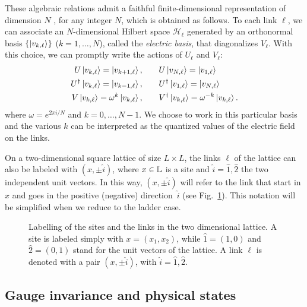 These algebraic relations admit a faithful finite-dimensional representation of dimension $N$ \cite{weyl1950theory}, for any integer $N$, which is obtained as follows.
To each link $\ell$, we can associate an $N$-dimensional Hilbert space $\mathcal{H}_\ell$ generated by an orthonormal basis $\{\ket{v_{k,\ell}}\}$ ($k=1, \dots,N$), called the \emph{electric basis},
that diagonalizes $V_\ell$.
With this choice, we can promptly write the actions of $U_\ell$ and $V_\ell$:
\begin{equation}
    \begin{split}
        U\ket{v_{k,\ell}}           = \ket{v_{k+1,\ell}}, & \qquad
        U\ket{v_{N,\ell}}           = \ket{v_{1,\ell}}\\
        U^{\dagger}\ket{v_{k,\ell}} = \ket{v_{k-1,\ell}}, & \qquad
        U^\dagger\ket{v_{1,\ell}}   = \ket{v_{N,\ell}}\\
        V\ket{v_{k,\ell}}           = \omega^k \ket{v_{k,\ell}}, & \qquad
        V^\dagger\ket{v_{k,\ell}}   = \omega^{-k} \ket{v_{k,\ell}}.
    \end{split}
    \label{eq:elect_basis_op_action}
\end{equation}
where $\omega = e^{2 \pi i / N}$ and $k = 0, \dots, N-1$.
We choose to work in this particular basis and the various $k$ can be interpreted as the quantized values of the electric field on the links.

On a  two-dimensional square lattice of size $L \times L$, the links $\ell$ of the lattice can also be labeled with $(x, \pm\hat{i})$, where $x \in \mathbb{L}$ is a site and
$\hat{i}=\hat{1}, \hat{2}$ the two independent unit vectors.
In this way, $(x, \pm\hat{i})$ will refer to the link that start in $x$ and goes in the positive (negative) direction~$\hat{i}$ (see Fig.~\ref{fig:link_labels}).
This notation will be simplified when we reduce to the ladder case.


\begin{figure}
    \centering
    
    \caption{
        Labelling of the sites and the links in the two dimensional lattice.
        A site is labeled simply with $x = (x_1, x_2)$, while $\hat{1} = (1,0)$ and $\hat{2} = (0,1)$ stand for the unit vectors of the lattice.
        A link $\ell$ is denoted with a pair $(x, \pm\hat{i})$, with $\hat{i} = \hat{1}, \hat{2}$.
    }%
    \label{fig:link_labels}
\end{figure}


\subsection{Gauge invariance and physical states}%
\label{sub:gauge_invariance}

